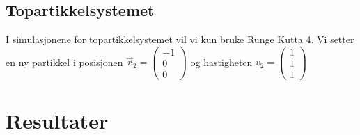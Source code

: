 \documentclass[reprint,english,notitlepage]{revtex4-1}  %
\begin{document}
\subsection*{Topartikkelsystemet}
I simulasjonene for topartikkelsystemet vil vi kun bruke Runge Kutta 4. Vi setter en ny partikkel i posisjonen $\vec{r}_2=\begin{pmatrix}
-1\\0\\0
\end{pmatrix}
$ og hastigheten $v_2=\begin{pmatrix}
1\\1\\1
\end{pmatrix}$
\section{Resultater}
\end{document}
